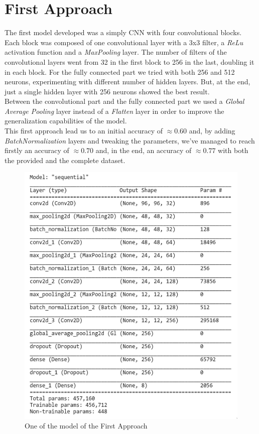 \documentclass[11pt]{article}
\begin{document}
\section*{First Approach}
The first model developed was a simply CNN with four convolutional blocks.\\ Each block was composed of one convolutional layer with a 3x3 filter, a \emph{ReLu} activation function and a \emph{MaxPooling} layer. The number of filters of the convolutional layers went from 32 in the first block to 256 in the last, doubling it in each block. For the fully connected part we tried with both 256 and 512 neurons, experimenting with different number of hidden layers. But, at the end, just a single hidden layer with 256 neurons showed the best result.\\
Between the convolutional part and the fully connected part we used a \emph{Global Average Pooling} layer instead of a \emph{Flatten} layer in order to improve the generalization capabilities of the model.\\
This first approach lead us to an initial accuracy of $\approx0.60$ and, by adding \emph{BatchNormalization} layers and tweaking the parameters, we've managed to reach firstly an accuracy of $\approx0.70$ and, in the end, an accuracy of $\approx0.77$ with both the provided and the complete dataset.

\begin{figure}[H]
	\center
	\includegraphics[scale=0.35]{model1.png}
	\caption{One of the model of the First Approach}
\end{figure}
\end{document}
